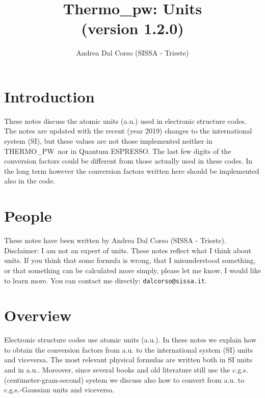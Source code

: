 \documentclass[12pt,a4paper]{article}
\def\version{1.2.0}
\def\qe{{\sc Quantum ESPRESSO}}
\def\tpw{{\sc THERMO\_PW}}
\begin{document}
 
\author{Andrea Dal Corso (SISSA - Trieste)}
\date{}


\title{
  \vskip 1cm
  {\color{red} \Huge Thermo\_pw: Units} \\
  \Large (version \version)
}

\maketitle

\newpage

\tableofcontents

\newpage

\section{{\color{coral}Introduction}}
These notes discuss the atomic units (a.u.) used in 
electronic structure codes. The notes are updated with the recent 
(year 2019) changes to the international system (SI), but these  
values are not those implemented neither in \tpw\ nor in \qe. The 
last few digits of the conversion factors could be different from 
those actually used in these codes. In the long term however the 
conversion factors written here should be implemented also in the code. 

\newpage
\section{\color{coral}People}
These notes have been written by Andrea Dal Corso (SISSA - Trieste). \\
Disclaimer: I am not an expert of units. 
These notes reflect what I think about units.
If you think that some formula is wrong, that I misunderstood something, or 
that something can be calculated more simply, please let me know, I would 
like to learn more. 
You can contact me directly: \texttt{dalcorso@sissa.it}. 

\newpage
\section{\color{coral}Overview}
Electronic structure codes use atomic units (a.u.). 
In these notes we explain how to obtain the conversion factors 
from a.u. to the international system (SI) units and viceversa. 
The most relevant physical formulas are written both in SI units 
and in a.u.. Moreover, since several books and old literature still 
use the c.g.s. (centimeter-gram-second) system we discuss also how 
to convert from a.u. to c.g.s.-Gaussian units and viceversa.
\end{document}
